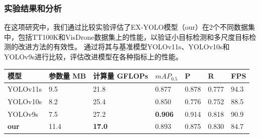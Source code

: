 \subsubsection{实验结果和分析}

在这项研究中，我们通过比较实验评估了EX-YOLO模型（our）在2个不同数据集中，包括TT100K和VisDrone数据集上的性能，以验证小目标检测和多尺度目标检测的改进方法的有效性。
通过将其与基准模型YOLOv11s、YOLOv10s和YOLOv9s进行比较，评估改进模型在各种指标上的性能。

\begin{table}[htbp]
    \centering
    \captionsetup{font=footnotesize}
    \label{tab:compare_studies_tt100k}
    \begin{tabular}{p{}p{}p{}p{}p{}p{}p{}}
        \toprule
        模型       & 参数量 MB & 计算量 GFLOPs & $mAP_{0.5}$   & P     & R     & FPS \\ 
        \midrule
        YOLOv11s     & 9.5           & 21.8          & 0.877          & 0.878  & 0.777 & 94.3 \\
        YOLOv10s     & 8.2           & 25.4          & 0.850          & 0.776  & 0.752 & 88.5 \\
        YOLOv9s      & 7.5           & 27.2          & \textbf{0.906} & 0.914  & 0.818 & 90.9 \\
        \textbf{our} & 11.4          & \textbf{17.0} & 0.893          & 0.875  & 0.830 & 84.7 \\
        \bottomrule
    \end{tabular}
\end{table}

